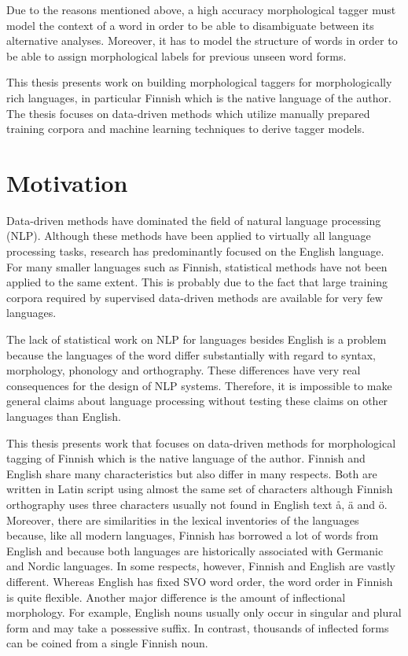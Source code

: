 Due to the reasons mentioned above, a high accuracy morphological
tagger must model the context of a word in order to be able to
disambiguate between its alternative analyses. Moreover, it has to
model the structure of words in order to be able to assign
morphological labels for previous unseen word forms.

This thesis presents work on building morphological taggers for
morphologically rich languages, in particular Finnish which is the
native language of the author. The thesis focuses on data-driven
methods which utilize manually prepared training corpora and machine
learning techniques to derive tagger models.

\section{Motivation}
Data-driven methods have dominated the field of natural language
processing (NLP). Although these methods have been applied to
virtually all language processing tasks, research has predominantly focused
on the English language. For many smaller languages such as Finnish,
statistical methods have not been applied to the same extent. This is
probably due to the fact that large training corpora required by
supervised data-driven methods are available for very few languages.

The lack of statistical work on NLP for languages besides English is a
problem because the languages of the word differ substantially with
regard to syntax, morphology, phonology and orthography. These
differences have very real consequences for the design of NLP
systems. Therefore, it is impossible to make general claims about
language processing without testing these claims on other languages
than English.

This thesis presents work that focuses on data-driven methods for
morphological tagging of Finnish which is the native language of the
author. Finnish and English share many characteristics but also differ
in many respects. Both are written in Latin script using almost the
same set of characters although Finnish orthography uses three
characters usually not found in English text å, ä and ö. Moreover,
there are similarities in the lexical inventories of the languages
because, like all modern languages, Finnish has borrowed a lot of
words from English and because both languages are historically
associated with Germanic and Nordic languages. In some respects,
however, Finnish and English are vastly different. Whereas English has
fixed SVO word order, the word order in Finnish is quite
flexible. Another major difference is the amount of inflectional
morphology. For example, English nouns usually only occur in singular
and plural form and may take a possessive suffix. In contrast,
thousands of inflected forms can be coined from a single Finnish noun.


